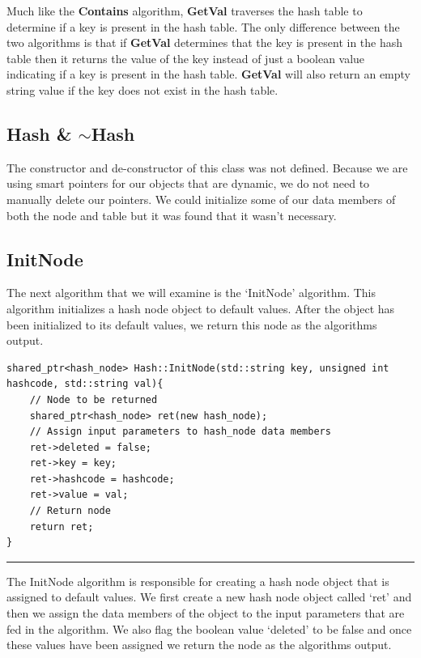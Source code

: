 \documentclass[a4paper,9pt]{article}
\newcommand{\horizontalline}{\noindent \rule{\textwidth}{0.5pt}\par}
\begin{document}
\noindent Much like the \textbf{Contains} algorithm, \textbf{GetVal} traverses the hash table to determine if a key is present in the hash table. The only difference between the two algorithms is
that if \textbf{GetVal} determines that the key is present in the hash table then it returns the value of the key instead of just a boolean value indicating if a key is present in the hash table.
\textbf{GetVal} will also return an empty string value if the key does not exist in the hash table.

\subsection*{Hash \& $\sim$Hash}

The constructor and de-constructor of this class was not defined. Because we are using smart pointers for our objects that are dynamic, we do not need to manually delete our pointers. We could
initialize some of our data members of both the node and table but it was found that it wasn't necessary.

\subsection*{InitNode}

The next algorithm that we will examine is the `InitNode' algorithm. This algorithm initializes a hash node object to default values. After the object has been initialized to its default values,
we return this node as the algorithms output.

\begin{highlight}

\begin{verbatim}
shared_ptr<hash_node> Hash::InitNode(std::string key, unsigned int hashcode, std::string val){
    // Node to be returned
    shared_ptr<hash_node> ret(new hash_node);
    // Assign input parameters to hash_node data members
    ret->deleted = false;
    ret->key = key;
    ret->hashcode = hashcode;
    ret->value = val;
    // Return node
    return ret;
}
\end{verbatim}

\horizontalline

The InitNode algorithm is responsible for creating a hash node object that is assigned to default values. We first create a new hash node object called `ret' and then we assign the data members of
the object to the input parameters that are fed in the algorithm. We also flag the boolean value `deleted' to be false and once these values have been assigned we return the node as the algorithms
output.

\end{highlight}
\end{document}
